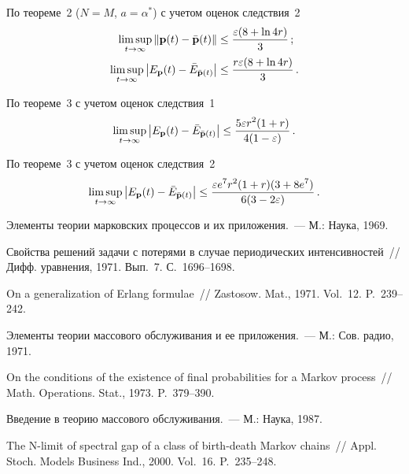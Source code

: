 \begin{multicols}{2}
По теореме~2 ($N=M$, $a=\alpha^*$) с учетом оценок следствия~2
\begin{align*}
\limsup\limits_{t \to \infty} \|{\bf p}(t)- \bar{\bf p}(t)\| &\le 
\displaystyle\frac{\displaystyle \varepsilon(8+\ln{4r})\mathstrut}{\displaystyle 3\mathstrut}\,;
\\
\limsup\limits_{t \to \infty}   \left|E_{\bf p}(t)- \bar{E}_{\bar{\bf p}(t)}\right| &\le 
\displaystyle\frac{\displaystyle r\varepsilon(8 + \ln{4r})\mathstrut}{\displaystyle 3\mathstrut}\,.
\end{align*}

По теореме~3 с учетом оценок следствия~1
\begin{equation*}
\limsup\limits_{t \to \infty}   \left|E_{\bf p}(t)- \bar{E}_{\bar{\bf p}(t)}\right| \le 
\displaystyle\frac{\displaystyle 5 \varepsilon r^2 (1+r)\mathstrut}{\displaystyle 4(1- \varepsilon)\mathstrut}\,.
\end{equation*}

По теореме~3 с учетом оценок следствия~2
\begin{equation*}
\limsup\limits_{t \to \infty}   \left|E_{\bf p}(t)- \bar{E}_{\bar{\bf p}(t)}\right| \le 
\displaystyle\frac{\displaystyle \varepsilon e^{7} r^2 (1+r) (3+8e^{7})\mathstrut}{\displaystyle 6(3-2\varepsilon)\mathstrut}\,.
\end{equation*}

{\small\frenchspacing
{%
\begin{thebibliography}{99}

 Элементы теории марковских процессов и их
приложения.~--- М.: Наука, 1969.

 Свойства решений задачи с потерями
в случае периодических интенсивностей~// Дифф. уравнения, 1971.
Вып.~7. С.~1696--1698.

 On a generalization of Erlang formulae~// 
Zastosow. Mat., 1971. Vol.~12. P.~239--242.

 Элементы теории массового обслуживания
 и ее приложения.~--- М.: Сов. радио, 1971.

 On the conditions of the
existence of final probabilities for a Markov process~// Math.
Operations. Stat., 1973. P.~379--390.

 Введение в теорию массового
обслуживания.~--- М.: Наука, 1987.
\pagebreak

  The N-limit of spectral gap of 
a class of birth-death Markov chains~//
 Appl. Stoch. Models Business Ind., 2000. Vol.~16. P.~235--248.


\end{thebibliography}}}
\end{multicols}
